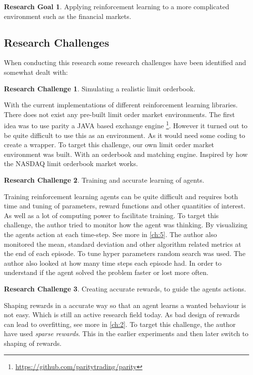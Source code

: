 \documentclass{kththesis}
\theoremstyle{definition}
\newtheorem{RG}{Research Goal}[section]
\newtheorem{RC}{Research Challenge}[section]
\begin{document}
\begin{RG}
Applying reinforcement learning to a more complicated environment such as the financial markets.
\end{RG}

\subsection{Research Challenges}
When conducting this research some research challenges have been identified and somewhat dealt with:
\begin{RC}
Simulating a realistic limit orderbook.
\end{RC}
With the current implementations of different reinforcement learning libraries. There does not exist any pre-built limit order market environments. The first idea was to use parity a JAVA based exchange engine \footnote{\url{https://github.com/paritytrading/parity}}. However it turned out to be quite difficult to use this as an environment. As it would need some coding to create a wrapper. To target this challenge, our own limit order market environment was built. With an orderbook and matching engine. Inspired by how the NASDAQ limit orderbook market works.

\begin{RC}
Training and accurate learning of agents. 
\end{RC}

Training reinforcement learning agents can be quite difficult and requires both time and tuning of parameters, reward functions and other quantities of interest. 
\newpage
As well as a lot of computing power to facilitate training. To target this challenge, the author tried to monitor how the agent was thinking. By visualizing the agents action at each time-step. See more in \autoref{ch:5}. The author also monitored the mean, standard deviation and other algorithm related metrics at the end of each episode. To tune hyper parameters random search was used. The author also looked at how many time steps each episode had. In order to understand if the agent solved the problem faster or lost more often.

\begin{RC}
Creating accurate rewards, to guide the agents actions.
\end{RC}
Shaping rewards in a accurate way so that an agent learns a wanted behaviour is not easy. Which is still an active research field today. As bad design of rewards can lead to overfitting, see more in \autoref{ch:2}. To target this challenge, the author have used \textit{sparse rewards}. This in the earlier experiments and then later switch to shaping of rewards.
\end{document}
